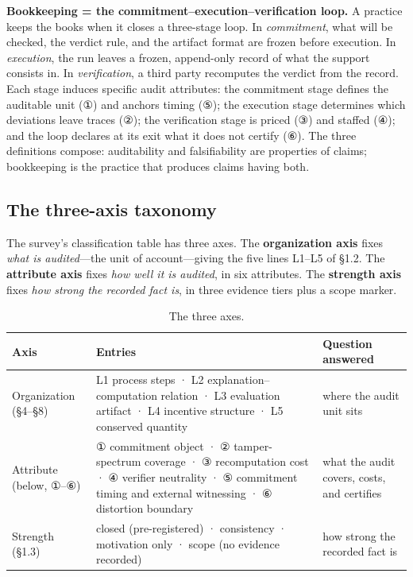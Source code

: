 \documentclass[11pt,a4paper]{article}
\begin{document}
\textbf{Bookkeeping = the commitment–execution–verification loop.} A practice keeps the books when it closes a three-stage loop. In \textit{commitment}, what will be checked, the verdict rule, and the artifact format are frozen before execution. In \textit{execution}, the run leaves a frozen, append-only record of what the support consists in. In \textit{verification}, a third party recomputes the verdict from the record. Each stage induces specific audit attributes: the commitment stage defines the auditable unit (①) and anchors timing (⑤); the execution stage determines which deviations leave traces (②); the verification stage is priced (③) and staffed (④); and the loop declares at its exit what it does not certify (⑥). The three definitions compose: auditability and falsifiability are properties of claims; bookkeeping is the practice that produces claims having both.

\subsection{The three-axis taxonomy}

The survey's classification table has three axes. The \textbf{organization axis} fixes \textit{what is audited}—the unit of account—giving the five lines L1–L5 of §1.2. The \textbf{attribute axis} fixes \textit{how well it is audited}, in six attributes. The \textbf{strength axis} fixes \textit{how strong the recorded fact is}, in three evidence tiers plus a scope marker.

\begin{table}[htbp]
\centering
\footnotesize
\setlength{\tabcolsep}{3.5pt}
\renewcommand{\arraystretch}{1.18}
\begin{tabularx}{0.985\textwidth}{>{\raggedright\arraybackslash}p{} >{\raggedright\arraybackslash}X >{\raggedright\arraybackslash}p{}}
\toprule
\textbf{Axis} & \textbf{Entries} & \textbf{Question answered} \\
\midrule
Organization (§4–§8) & L1 process steps · L2 explanation–computation relation · L3 evaluation artifact · L4 incentive structure · L5 conserved quantity & where the audit unit sits \\
Attribute (below, ①–⑥) & ① commitment object · ② tamper-spectrum coverage · ③ recomputation cost · ④ verifier neutrality · ⑤ commitment timing and external witnessing · ⑥ distortion boundary & what the audit covers, costs, and certifies \\
Strength (§1.3) & closed (pre-registered) · consistency · motivation only · scope (no evidence recorded) & how strong the recorded fact is \\
\bottomrule
\end{tabularx}
\caption{The three axes.}
\label{tab:T1}
\end{table}
\end{document}
